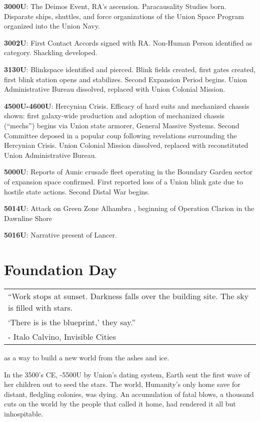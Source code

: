 \textbf{3000U}: The Deimos Event, RA’s ascension. Paracausality Studies born. Disparate ships, shuttles,
and force organizations of the Union Space Program organized into the Union Navy.

\textbf{3002U}: First Contact Accords signed with RA. Non-Human Person identified as category.
Shackling developed.

\textbf{3130U}: Blinkspace identified and pierced. Blink fields created, first gates created, first blink
station opens and stabilizes. Second Expansion Period begins. Union Administrative Bureau
dissolved, replaced with Union Colonial Mission.

\textbf{4500U-4600U}: Hercynian Crisis. Efficacy of hard suits and mechanized chassis shown: first
galaxy-wide production and adoption of mechanized chassis (“mechs”) begins via Union state
armorer, General Massive Systems. Second Committee deposed in a popular coup following
revelations surrounding the Hercynian Crisis. Union Colonial Mission dissolved, replaced with
reconstituted Union Administrative Bureau.

\textbf{5000U}: Reports of Aunic crusade fleet operating in the Boundary Garden sector of expansion
space confirmed. First reported loss of a Union blink gate due to hostile state actions. Second
Distal War begins.

\textbf{5014U}: Attack on Green Zone Alhambra , beginning of Operation Clarion in the Dawnline Shore

\textbf{5016U}: Narrative present of Lancer.

\section{Foundation Day}

\begin{center}
  \itshape
  \begin{tabular}{l}
    “Work stops at sunset. Darkness falls over the building site. The sky is filled with stars.\\
    ‘There is is the blueprint,’ they say.”\\
    \quad - Italo Calvino, \textnormal{Invisible Cities}
  \end{tabular}
\end{center}

 as a way to build a new world from the ashes and ice.

In the 3500’s CE, -5500U by Union’s dating system, Earth sent the first wave of her children out
to seed the stars. The world, Humanity’s only home save for distant, fledgling colonies, was
dying. An accumulation of fatal blows, a thousand cuts on the world by the people that called it
home, had rendered it all but inhospitable.

